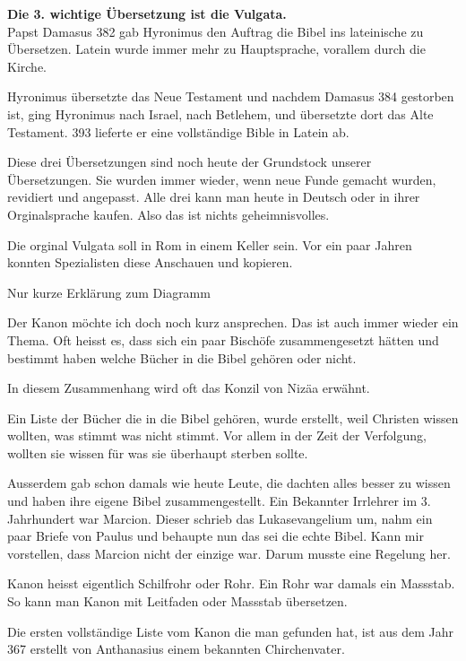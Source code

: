 \documentclass[fontsize=16pt]{mybib}
\begin{document}
\begin{otsblock}
    \textbf{Die 3. wichtige Übersetzung ist die Vulgata.}\\
    Papst Damasus 382 gab Hyronimus den Auftrag die Bibel ins lateinische zu Übersetzen. Latein wurde immer mehr zu Hauptsprache, vorallem durch die Kirche.

    Hyronimus übersetzte das Neue Testament und nachdem Damasus 384 gestorben ist, ging Hyronimus nach Israel, nach Betlehem, und übersetzte dort das Alte Testament. 393 lieferte er eine vollständige Bible in Latein ab.

    Diese drei Übersetzungen sind noch heute der Grundstock unserer Übersetzungen. Sie wurden immer wieder, wenn neue Funde gemacht wurden, revidiert und angepasst. Alle drei kann man heute in Deutsch oder in ihrer Orginalsprache kaufen. Also das ist nichts geheimnisvolles.

    Die orginal Vulgata soll in Rom in einem Keller sein. Vor ein paar Jahren konnten Spezialisten diese Anschauen und kopieren.
\end{otsblock}
\begin{otsblock}
    Nur kurze Erklärung zum Diagramm
\end{otsblock}
\begin{otsblock}
    Der Kanon möchte ich doch noch kurz ansprechen. Das ist auch immer wieder ein Thema. Oft heisst es, dass sich ein paar Bischöfe zusammengesetzt hätten und bestimmt haben welche Bücher in die Bibel gehören oder nicht.

    In diesem Zusammenhang wird oft das Konzil von Nizäa erwähnt.

    Ein Liste der Bücher die in die Bibel gehören, wurde erstellt, weil Christen wissen wollten, was stimmt was nicht stimmt. Vor allem in der Zeit der Verfolgung, wollten sie wissen für was sie überhaupt sterben sollte.

    Ausserdem gab schon damals wie heute Leute, die dachten alles besser zu wissen und haben ihre eigene Bibel zusammengestellt. Ein Bekannter Irrlehrer im 3. Jahrhundert \nChr{} war Marcion. Dieser schrieb  das Lukasevangelium um, nahm ein paar Briefe von Paulus und behaupte nun das sei die echte Bibel. Kann mir vorstellen, dass Marcion nicht der einzige war. Darum musste eine Regelung her.

    Kanon heisst eigentlich Schilfrohr oder Rohr. Ein Rohr war damals ein Massstab. So kann man Kanon mit Leitfaden oder Massstab übersetzen.

    Die ersten vollständige Liste vom Kanon die man gefunden hat, ist aus dem Jahr 367 \nChr{} erstellt von Anthanasius einem bekannten Chirchenvater.
\end{otsblock}
\end{document}
